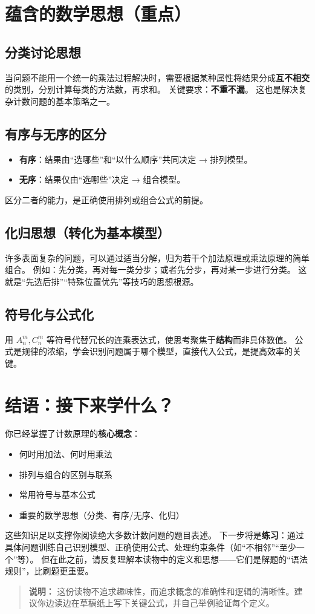 \documentclass[10pt]{article}
\begin{document}
\section{蕴含的数学思想（重点）}

\subsection{分类讨论思想}

当问题不能用一个统一的乘法过程解决时，需要根据某种属性将结果分成\textbf{互不相交}的类别，分别计算每类的方法数，再求和。
关键要求：\textbf{不重不漏}。
这也是解决复杂计数问题的基本策略之一。

\subsection{有序与无序的区分}

\begin{itemize}
\item \textbf{有序}：结果由“选哪些”和“以什么顺序”共同决定 → 排列模型。
\item \textbf{无序}：结果仅由“选哪些”决定 → 组合模型。
\end{itemize}
区分二者的能力，是正确使用排列或组合公式的前提。

\subsection{化归思想（转化为基本模型）}

许多表面复杂的问题，可以通过适当分解，归为若干个加法原理或乘法原理的简单组合。
例如：先分类，再对每一类分步；或者先分步，再对某一步进行分类。
这就是“先选后排”“特殊位置优先”等技巧的思想根源。

\subsection{符号化与公式化}

用 \(A_n^m, C_n^m\) 等符号代替冗长的连乘表达式，使思考聚焦于\textbf{结构}而非具体数值。
公式是规律的浓缩，学会识别问题属于哪个模型，直接代入公式，是提高效率的关键。

\section*{结语：接下来学什么？}

你已经掌握了计数原理的\textbf{核心概念}：
\begin{itemize}
\item 何时用加法、何时用乘法
\item 排列与组合的区别与联系
\item 常用符号与基本公式
\item 重要的数学思想（分类、有序/无序、化归）
\end{itemize}

这些知识足以支撑你阅读绝大多数计数问题的题目表述。
下一步将是\textbf{练习}：通过具体问题训练自己识别模型、正确使用公式、处理约束条件（如“不相邻”“至少一个”等）。
但在此之前，请反复理解本读物中的定义和思想——它们是解题的“语法规则”，比刷题更重要。

\begin{quote}
\textbf{说明：} 这份读物不追求趣味性，而追求概念的准确性和逻辑的清晰性。建议你边读边在草稿纸上写下关键公式，并自己举例验证每个定义。
\end{quote}
\end{document}
